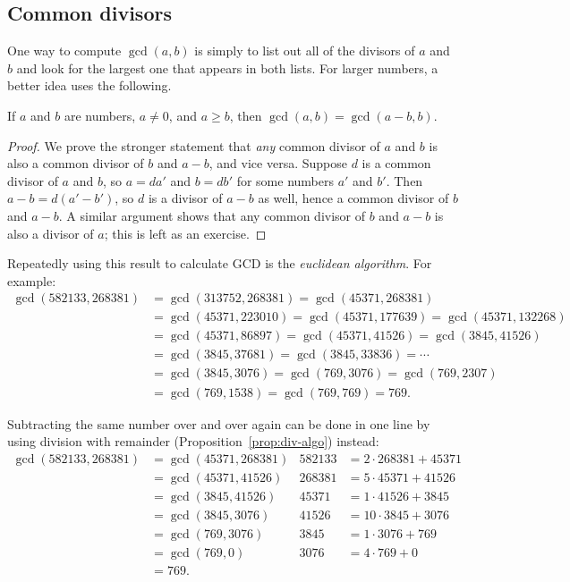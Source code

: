 \subsection{Common divisors}

One way to compute $\gcd(a,b)$ is simply to list out all of the divisors of $a$ and $b$ and look for the largest one that appears in both lists. For larger numbers, a better idea uses the following.

\begin{proposition}
If $a$ and $b$ are numbers, $a\neq 0$, and $a\geq b$, then $\gcd(a,b) = \gcd(a - b, b)$.
\end{proposition}
\begin{proof}
We prove the stronger statement that \textit{any} common divisor of $a$ and $b$ is also a common divisor of $b$ and $a - b$, and vice versa. Suppose $d$ is a common divisor of $a$ and $b$, so $a = da'$ and $b = db'$ for some numbers $a'$ and $b'$. Then $a - b = d(a' - b')$, so $d$ is a divisor of $a - b$ as well, hence a common divisor of $b$ and $a - b$. A similar argument shows that any common divisor of $b$ and $a - b$ is also a divisor of $a$; this is left as an exercise.
\end{proof}

Repeatedly using this result to calculate GCD is the \emph{euclidean algorithm}. For example:
\begin{align*}
\gcd(582133, 268381) &= \gcd(313752, 268381) = \gcd(45371, 268381) \\
&= \gcd(45371, 223010) = \gcd(45371, 177639) = \gcd(45371, 132268) \\
&= \gcd(45371, 86897) = \gcd(45371, 41526) = \gcd(3845, 41526) \\
&= \gcd(3845, 37681) = \gcd(3845, 33836) = \cdots \\
&= \gcd(3845, 3076) = \gcd(769, 3076) = \gcd(769, 2307) \\
&= \gcd(769, 1538) = \gcd(769, 769) = \boxed{769}.
\end{align*}

Subtracting the same number over and over again can be done in one line by using division with remainder (Proposition~\ref{prop:div-algo}) instead:
\begin{align*}
\gcd(582133, 268381) &= \gcd(45371, 268381) & 582133 &= 2\cdot 268381 + 45371 \\
&= \gcd(45371, 41526) & 268381 &= 5\cdot 45371 + 41526 \\
&= \gcd(3845, 41526) & 45371 &= 1\cdot 41526 + 3845 \\
&= \gcd(3845, 3076) & 41526 &= 10\cdot 3845 + 3076 \\
&= \gcd(769, 3076) & 3845 &= 1\cdot 3076 + 769 \\
&= \gcd(769, 0) & 3076 &= 4\cdot 769 + 0 \\
&= \boxed{769}.
\end{align*}


